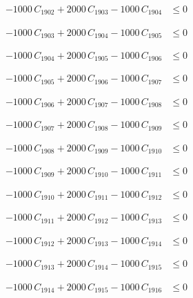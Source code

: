 \documentclass[a4paper,11pt]{article}
\begin{document}
\begin{align}
-1000\,C_{1902} + 2000\,C_{1903} - 1000\,C_{1904} &\leq 0 \nonumber
\end{align}

\begin{align}
-1000\,C_{1903} + 2000\,C_{1904} - 1000\,C_{1905} &\leq 0 \nonumber
\end{align}

\begin{align}
-1000\,C_{1904} + 2000\,C_{1905} - 1000\,C_{1906} &\leq 0 \nonumber
\end{align}

\begin{align}
-1000\,C_{1905} + 2000\,C_{1906} - 1000\,C_{1907} &\leq 0 \nonumber
\end{align}

\begin{align}
-1000\,C_{1906} + 2000\,C_{1907} - 1000\,C_{1908} &\leq 0 \nonumber
\end{align}

\begin{align}
-1000\,C_{1907} + 2000\,C_{1908} - 1000\,C_{1909} &\leq 0 \nonumber
\end{align}

\begin{align}
-1000\,C_{1908} + 2000\,C_{1909} - 1000\,C_{1910} &\leq 0 \nonumber
\end{align}

\begin{align}
-1000\,C_{1909} + 2000\,C_{1910} - 1000\,C_{1911} &\leq 0 \nonumber
\end{align}

\begin{align}
-1000\,C_{1910} + 2000\,C_{1911} - 1000\,C_{1912} &\leq 0 \nonumber
\end{align}

\begin{align}
-1000\,C_{1911} + 2000\,C_{1912} - 1000\,C_{1913} &\leq 0 \nonumber
\end{align}

\begin{align}
-1000\,C_{1912} + 2000\,C_{1913} - 1000\,C_{1914} &\leq 0 \nonumber
\end{align}

\begin{align}
-1000\,C_{1913} + 2000\,C_{1914} - 1000\,C_{1915} &\leq 0 \nonumber
\end{align}

\begin{align}
-1000\,C_{1914} + 2000\,C_{1915} - 1000\,C_{1916} &\leq 0 \nonumber
\end{align}
\end{document}
